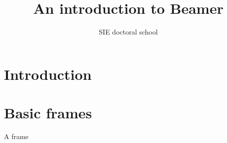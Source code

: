 \documentclass[11pt]{beamer}
\author{SIE doctoral school}
\title{An introduction to Beamer}
\institute{Université Savoie Mont Blanc}
\begin{document}
\section{Introduction}

\begin{frame}[plain] %
    \titlepage
\end{frame}

\begin{frame}
    \tableofcontents
\end{frame}

\section{Basic frames}

\begin{frame}{A frame}

\end{frame}
\end{document}
